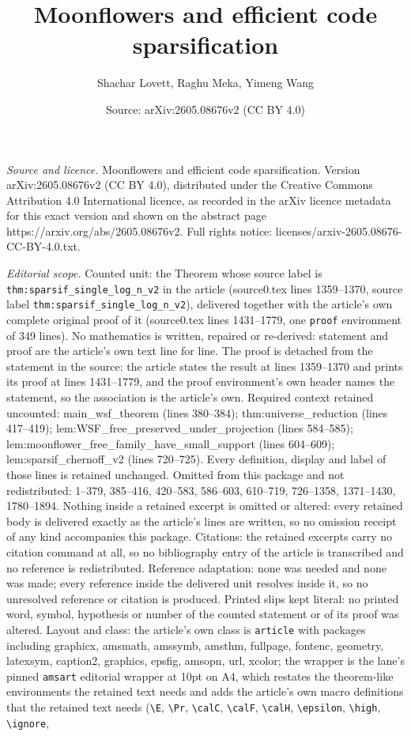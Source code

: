 \documentclass[10pt,a4paper]{amsart}
\title[Moonflowers and efficient code sparsification]{Moonflowers and efficient code sparsification}
\author{Shachar Lovett, Raghu Meka, Yimeng Wang}
\date{Source: arXiv:2605.08676v2 (CC BY 4.0)}
\begin{document}
\maketitle

\noindent\emph{Source and licence.} Moonflowers and efficient code sparsification. Version arXiv:2605.08676v2 (CC BY 4.0), distributed under the Creative Commons Attribution 4.0 International licence, as recorded in the arXiv licence metadata for this exact version and shown on the abstract page https://arxiv.org/abs/2605.08676v2. Full rights notice: licenses/arxiv-2605.08676-CC-BY-4.0.txt.\par\smallskip

\noindent\textit{Editorial scope.} Counted unit: the Theorem whose source label is \texttt{thm:sparsif\_single\_log\_n\_v2} in the article (source0.tex lines 1359--1370, source label \texttt{thm:sparsif\_single\_log\_n\_v2}), delivered together with the article's own complete original proof of it (source0.tex lines 1431--1779, one \texttt{proof} environment of 349 lines). No mathematics is written, repaired or re-derived: statement and proof are the article's own text line for line. The proof is detached from the statement in the source: the article states the result at lines 1359--1370 and prints its proof at lines 1431--1779, and the proof environment's own header names the statement, so the association is the article's own. Required context retained uncounted: main\_wsf\_theorem (lines 380--384); thm:universe\_reduction (lines 417--419); lem:WSF\_free\_preserved\_under\_projection (lines 584--585); lem:moonflower\_free\_family\_have\_small\_support (lines 604--609); lem:sparsif\_chernoff\_v2 (lines 720--725). Every definition, display and label of those lines is retained unchanged. Omitted from this package and not redistributed: 1--379, 385--416, 420--583, 586--603, 610--719, 726--1358, 1371--1430, 1780--1894. Nothing inside a retained excerpt is omitted or altered: every retained body is delivered exactly as the article's lines are written, so no omission receipt of any kind accompanies this package. Citations: the retained excerpts carry no citation command at all, so no bibliography entry of the article is transcribed and no reference is redistributed. Reference adaptation: none was needed and none was made; every reference inside the delivered unit resolves inside it, so no unresolved reference or citation is produced. Printed slips kept literal: no printed word, symbol, hypothesis or number of the counted statement or of its proof was altered. Layout and class: the article's own class is \texttt{article} with packages including graphicx, amsmath, amssymb, amsthm, fullpage, fontenc, geometry, latexsym, caption2, graphics, epsfig, amsopn, url, xcolor; the wrapper is the lane's pinned \texttt{amsart} editorial wrapper at 10pt on A4, which restates the theorem-like environments the retained text needs and adds the article's own macro definitions that the retained text needs (\texttt{\textbackslash E}, \texttt{\textbackslash Pr}, \texttt{\textbackslash calC}, \texttt{\textbackslash calF}, \texttt{\textbackslash calH}, \texttt{\textbackslash epsilon}, \texttt{\textbackslash high}, \texttt{\textbackslash ignore}, 
\end{document}
